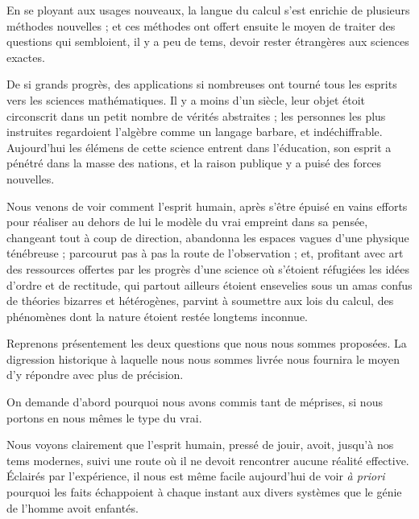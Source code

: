 \documentclass[11pt,a4paper]{article}
\begin{document}
En se ployant aux usages nouveaux, la langue du calcul s'est enrichie de
plusieurs méthodes nouvelles ; et ces méthodes ont offert ensuite le
moyen de traiter des questions qui sembloient, il y a peu de tems, devoir
rester étrangères aux  sciences exactes.

De si grands progrès, des applications si nombreuses ont tourné tous les
esprits vers les sciences mathématiques. Il y a moins d'un siècle, leur
objet étoit circonscrit dans un petit nombre de vérités abstraites ; les
 personnes les plus instruites regardoient l'algèbre comme
un langage barbare,  et
indéchiffrable. Aujourd'hui les élémens de cette science entrent dans
l'éducation, son esprit a pénétré dans la masse des nations, et
 la raison publique y a puisé des forces
nouvelles.

Nous venons de voir comment l'esprit humain, après s'être épuisé en
vains efforts pour réaliser au dehors de lui le modèle du vrai empreint
dans sa pensée, changeant tout à coup de direction, abandonna les
espaces vagues d'une physique ténébreuse ; parcourut pas à
pas la route de l'observation ; et, profitant avec art des ressources
offertes par les progrès d'une science où s'étoient réfugiées les idées
d'ordre et de rectitude, qui partout ailleurs étoient ensevelies sous un
 amas confus de théories bizarres et hétérogènes,
parvint à soumettre aux lois du calcul, des phénomènes  dont
la nature étoient restée longtems inconnue.

Reprenons présentement les deux questions que nous nous sommes
proposées. La digression historique à laquelle nous nous sommes livrée
nous fournira le moyen d'y répondre avec plus de précision.

On demande d'abord pourquoi nous avons commis tant de méprises, si nous
portons en nous mêmes le type du vrai.

Nous voyons clairement que l'esprit humain, pressé de jouir, avoit,
jusqu'à nos tems modernes, suivi une route où il ne devoit rencontrer
aucune réalité effective. Éclairés par l'expérience, il nous est même
facile aujourd'hui de voir \emph{à priori} pourquoi les faits
échappoient à chaque instant aux divers systèmes que le génie
 de l'homme avoit enfantés.
\end{document}
